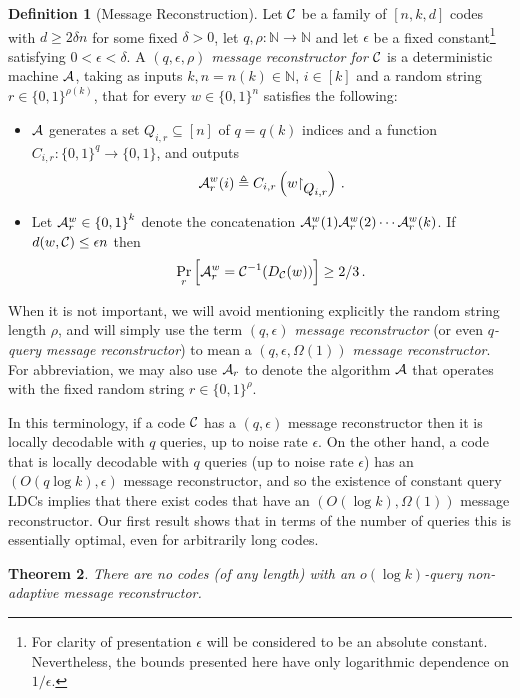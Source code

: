 \documentclass[10pt]{article}
\newtheorem{theorem}{Theorem}[section]
\theoremstyle{definition}
\newtheorem{definition}[theorem]{Definition}
\numberwithin{equation}{section}
\newcommand{\naturals}{{\mathbb N}}
\newcommand{\ALG}{{\cal A}}
\newcommand{\CC}{{\cal C}}
\newcommand{\zo}{{\{0,1\}}}
\newcommand{\DEC}{{D_{\cal C}}}
\newcommand{\rst}[1]{\ensuremath{{\mathbin\upharpoonright}%
\raise-.9ex\hbox{$#1$}}}
\begin{document}
\begin{definition}[Message Reconstruction] \label{def:msg_recon}
Let $\CC$ be a family of $[n,k,d]$ codes with $d \geq 2\delta n$ for some fixed $\delta > 0$, let $q,\rho:\naturals \to \naturals$ and let $\epsilon$ be a fixed constant\footnote{For clarity of presentation $\epsilon$ will be considered to be an absolute constant. Nevertheless, the bounds presented here have only logarithmic dependence on $1/\epsilon$.} satisfying $0 < \epsilon < \delta$.
A \emph{$(q,\epsilon,\rho)$ message reconstructor for $\CC$} is a deterministic machine $\ALG$, taking as inputs $k,n=n(k) \in \naturals$, $i\in [k]$ and a random string $r \in \zo^{\rho(k)}$, that for every $w \in \zo^n$ satisfies the following:
\begin{itemize}

\item $\ALG$ generates a set $Q_{i,r} \subseteq [n]$ of $q=q(k)$ indices and a function $C_{i,r}:\zo^q \to \zo$, and outputs
\[
\ALG^w_r(i) \triangleq C_{i,r}\left(w\rst{Q_{i,r}}\right)\,.
\]

\item Let $\ALG^w_r \in \zo^k$ denote the concatenation $\ALG^w_r(1)
  \ALG^w_r(2)  \cdots  \ALG^w_r(k)$. 
If $d(w,\CC) \leq \epsilon n$ then
\[
\Pr_r\Big[\ALG^w_r = \CC^{-1}(\DEC(w))\Big] \geq 2/3\,.
\]
\end{itemize}
When it is not important, we will avoid mentioning explicitly the random string length $\rho$, and will simply use the term \emph{$(q,\epsilon)$ message reconstructor} (or even \emph{$q$-query message reconstructor}) to mean a \emph{$(q,\epsilon, \Omega(1))$ message reconstructor}. For abbreviation, we may also use $\ALG_r$ to denote the algorithm $\ALG$ that operates with the fixed random string $r \in \zo^\rho$.
\end{definition}
In this terminology, if a code $\CC$ has a $(q,\epsilon)$ message reconstructor then it is locally decodable with $q$ queries, up to noise rate $\epsilon$. On the other hand, a code that is locally decodable with $q$ queries (up to noise rate $\epsilon$) has an $(O(q \log k),\epsilon)$ message reconstructor, and so the existence of constant query LDCs implies that there exist codes that have an $(O(\log k),\Omega(1))$ message reconstructor. Our first result shows that in terms of the number of queries this is essentially optimal, even for arbitrarily long codes.

\begin{theorem}\label{theo:msg}
There are no codes (of \emph{any} length) with an $o(\log k)$-query non-adaptive message reconstructor.
\end{theorem}
\end{document}
